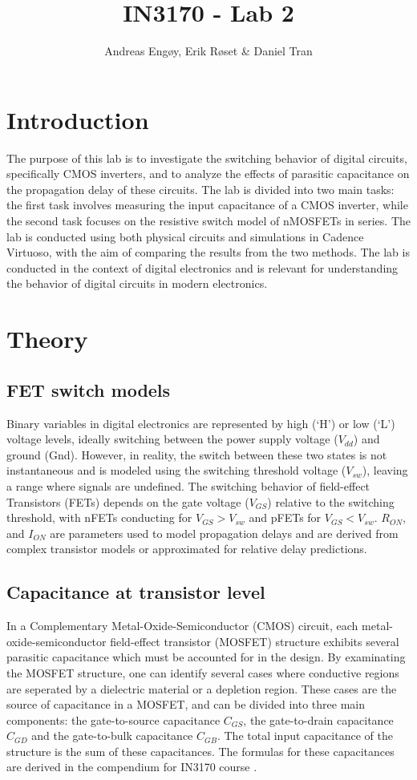 \documentclass[onecolumn]{article}
\title{IN3170 - Lab 2}
\author{Andreas Engøy, Erik Røset \& Daniel Tran}
\date{\monthname[\the\month] \the\year}
\begin{document}
\maketitle
\tableofcontents

\section{Introduction}
The purpose of this lab is to investigate the switching behavior of digital circuits, specifically CMOS inverters, and to analyze the effects of parasitic capacitance on the propagation delay of these circuits. The lab is divided into two main tasks: the first task involves measuring the input capacitance of a CMOS inverter, while the second task focuses on the resistive switch model of nMOSFETs in series. The lab is conducted using both physical circuits and simulations in Cadence Virtuoso, with the aim of comparing the results from the two methods. The lab is conducted in the context of digital electronics and is relevant for understanding the behavior of digital circuits in modern electronics.

\section{Theory}

\subsection{FET switch models}
Binary variables in digital electronics are represented by high (‘H’) or low (‘L’) voltage levels, ideally switching between the power supply voltage ($V_{dd}$) and ground (Gnd). However, in reality, the switch between these two states is not instantaneous and is modeled using the switching threshold voltage ($V_{sw}$), leaving a range where signals are undefined. The switching behavior of field-effect Transistors (FETs) depends on the gate voltage ($V_{GS}$) relative to the switching threshold, with nFETs conducting for $V_{GS} > V_{sw}$ and pFETs for $V_{GS} < V_{sw}$. $R_{ON}$, and $I_{ON}$ are parameters used to model propagation delays and are derived from complex transistor models or approximated for relative delay predictions.

\subsection{Capacitance at transistor level}
In a Complementary Metal-Oxide-Semiconductor (CMOS) circuit, each metal-oxide-semiconductor field-effect transistor (MOSFET) structure exhibits several parasitic capacitance which must be accounted for in the design. By examinating the MOSFET structure, one can identify several cases where conductive regions are seperated by a dielectric material or a depletion region. These cases are the source of capacitance in a MOSFET, and can be divided into three main components: the gate-to-source capacitance $C_{GS}$, the gate-to-drain capacitance $C_{GD}$ and the gate-to-bulk capacitance $C_{GB}$. The total input capacitance of the structure is the sum of these capacitances. The formulas for these capacitances are derived in the compendium for IN3170 course \cite{Kompendium}.
\end{document}
